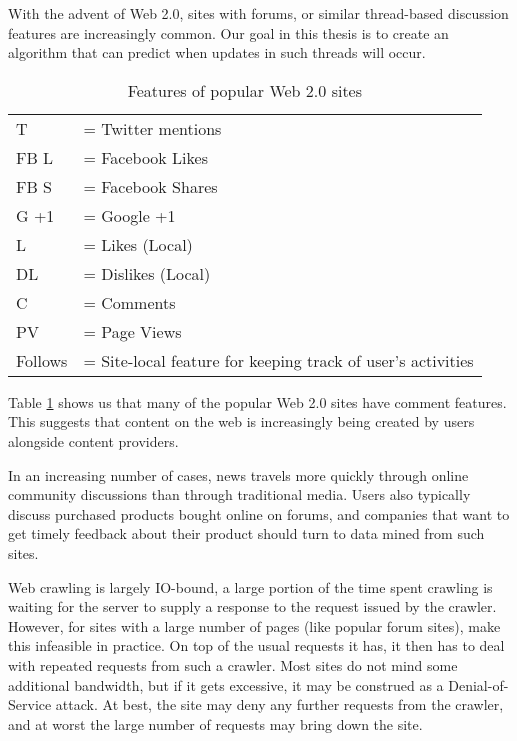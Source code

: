 With the advent of Web 2.0, sites with forums, or similar thread-based
discussion features are increasingly common.  Our goal in this thesis
is to create an algorithm that can predict when updates in such
threads will occur.
\begin{table}
	{\footnotesize
\caption{Features of popular Web 2.0 sites}
\label{table:web20}
	\begin{tabular}{l l}
		T &= Twitter mentions\\
	 FB L &= Facebook Likes \\
		FB S &= Facebook Shares\\
	G +1 &= Google +1\\
		   L&= Likes (Local) \\
   		DL &= Dislikes (Local) \\
			C &= Comments \\
		PV &= Page Views \\
   Follows &= Site-local feature for keeping track of user's activities
	\end{tabular}
}
\end{table}

Table \ref{table:web20} shows us that many of the popular Web 2.0
sites have comment features. This suggests that content on the web is
increasingly being created by users alongside content providers.

In an increasing number of cases, news travels more quickly through
online community discussions than through traditional media. Users also
typically discuss purchased products bought online on forums,
and companies that want to get timely feedback about their product
should turn to data mined from such sites.

Web crawling is largely IO-bound, a large portion of the time spent crawling is 
waiting for the server to supply a response to the request issued by the 
crawler. However, for sites with a large number of pages (like popular forum 
sites), make this infeasible in practice. On top of the usual requests it has, 
it then has to deal with repeated requests from such a crawler. Most sites do 
not mind some additional bandwidth, but if it gets excessive, it may be 
construed as a Denial-of-Service attack. At best, the site may deny any further 
requests from the crawler, and at worst the large number of requests may bring 
down the site.

